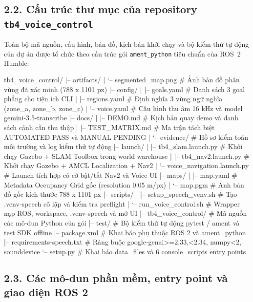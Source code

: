 \subsection*{2.2. Cấu trúc thư mục của repository \texttt{tb4\_voice\_control}}

Toàn bộ mã nguồn, cấu hình, bản đồ, kịch bản khởi chạy và bộ kiểm thử tự động của dự án được tổ chức theo cấu trúc gói \texttt{ament\_python} tiêu chuẩn của ROS~2 Humble:

\begin{svcode}
tb4_voice_control/
|-- artifacts/
|   `-- segmented_map.png          # Ảnh bản đồ phân vùng đã xác minh (788 x 1101 px)
|-- config/
|   |-- goals.yaml                 # Danh sách 3 goal phẳng cho tiện ích CLI
|   |-- regions.yaml               # Định nghĩa 3 vùng ngữ nghĩa (zone_a, zone_b, zone_c)
|   `-- voice.yaml                 # Cấu hình thu âm 16 kHz và model gemini-3.5-transcribe
|-- docs/
|   |-- DEMO.md                    # Kịch bản quay demo và danh sách cảnh cần thu thập
|   |-- TEST_MATRIX.md             # Ma trận tách biệt AUTOMATED PASS và MANUAL PENDING
|   `-- evidence/                  # Hồ sơ kiểm toán môi trường và log kiểm thử tự động
|-- launch/
|   |-- tb4_slam.launch.py         # Khởi chạy Gazebo + SLAM Toolbox trong world warehouse
|   |-- tb4_nav2.launch.py         # Khởi chạy Gazebo + AMCL Localization + Nav2
|   `-- voice_navigation.launch.py # Launch tích hợp có cờ bật/tắt Nav2 và Voice UI
|-- maps/
|   |-- map.yaml                   # Metadata Occupancy Grid gốc (resolution 0.05 m/px)
|   `-- map.pgm                    # Ảnh bản đồ gốc kích thước 788 x 1101 px
|-- scripts/
|   |-- setup_speech_venv.sh       # Tạo .venv-speech cô lập và kiểm tra preflight
|   `-- run_voice_control.sh       # Wrapper nạp ROS, workspace, .venv-speech và mở UI
|-- tb4_voice_control/             # Mã nguồn các mô-đun Python của gói
|-- test/                          # Bộ kiểm thử tự động pytest / ament và test SDK offline
|-- package.xml                    # Khai báo phụ thuộc ROS 2 và ament_python
|-- requirements-speech.txt        # Ràng buộc google-genai>=2.33,<2.34, numpy<2, sounddevice
`-- setup.py                       # Khai báo data_files và 6 console_scripts entry points
\end{svcode}

\subsection*{2.3. Các mô-đun phần mềm, entry point và giao diện ROS 2}

